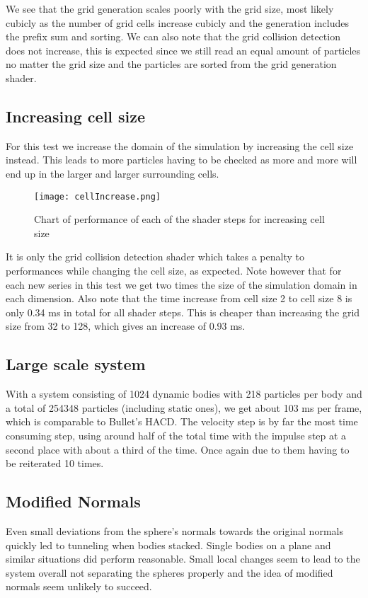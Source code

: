 We see that the grid generation scales poorly with the grid size, most likely cubicly
as the number of grid cells increase cubicly and the generation includes the prefix sum and sorting.
We can also note that the grid collision detection does not increase, this is expected since
we still read an equal amount of particles no matter the grid size and the particles are
sorted from the grid generation shader.

\subsection{Increasing cell size}
For this test we increase the domain of the simulation by increasing the cell size instead.
This leads to more particles having to be checked as more and more will end up in
the larger and larger surrounding cells.
\begin{figure}[H]
  \centering
  \texttt{[image: cellIncrease.png]}
  \caption{Chart of performance of each of the shader steps for increasing cell size}
\end{figure}

It is only the grid collision detection shader which takes a penalty to performances
while changing the cell size, as expected. Note however that for each new series
in this test we get two times the size of the simulation domain in each dimension.
Also note that the time increase from cell size 2 to cell size 8 is only 0.34 ms in total for all shader steps.
This is cheaper than increasing the grid size from 32 to 128, which gives an increase of 0.93 ms.

\subsection{Large scale system}
With a system consisting of 1024 dynamic bodies with 218 particles per body
 and a total of 254348 particles (including
static ones), we get about 103 ms per frame, which is comparable to Bullet's HACD.
The velocity step is by far the most time consuming step, using around half of the total time with
the impulse step at a second place with about a third of the time. Once again due
to them having to be reiterated 10 times.

\subsection{Modified Normals}
Even small deviations from the sphere's normals towards the original normals quickly
led to tunneling when bodies stacked. Single bodies on a plane and similar situations
did perform reasonable. Small local changes seem to lead to the system overall not
separating the spheres properly and the idea of modified
normals seem unlikely to succeed.

